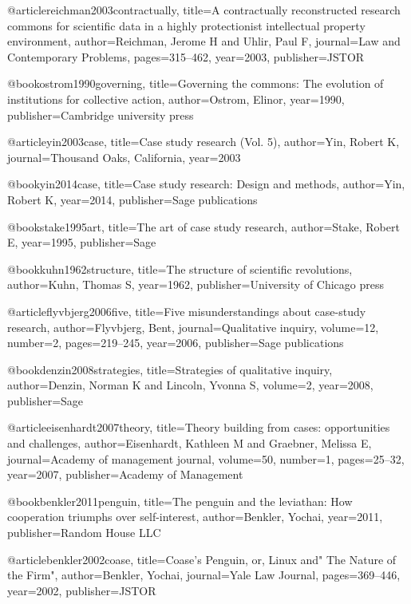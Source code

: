 @article{reichman2003contractually,
  title={A contractually reconstructed research commons for scientific data in a highly protectionist intellectual property environment},
  author={Reichman, Jerome H and Uhlir, Paul F},
  journal={Law and Contemporary Problems},
  pages={315--462},
  year={2003},
  publisher={JSTOR}
}


@book{ostrom1990governing,
  title={Governing the commons: The evolution of institutions for collective action},
  author={Ostrom, Elinor},
  year={1990},
  publisher={Cambridge university press}
}

@article{yin2003case,
  title={Case study research (Vol. 5)},
  author={Yin, Robert K},
  journal={Thousand Oaks, California},
  year={2003}
}

@book{yin2014case,
  title={Case study research: Design and methods},
  author={Yin, Robert K},
  year={2014},
  publisher={Sage publications}
}

@book{stake1995art,
  title={The art of case study research},
  author={Stake, Robert E},
  year={1995},
  publisher={Sage}
}

@book{kuhn1962structure,
  title={The structure of scientific revolutions},
  author={Kuhn, Thomas S},
  year={1962},
  publisher={University of Chicago press}
}

@article{flyvbjerg2006five,
  title={Five misunderstandings about case-study research},
  author={Flyvbjerg, Bent},
  journal={Qualitative inquiry},
  volume={12},
  number={2},
  pages={219--245},
  year={2006},
  publisher={Sage publications}
}

@book{denzin2008strategies,
  title={Strategies of qualitative inquiry},
  author={Denzin, Norman K and Lincoln, Yvonna S},
  volume={2},
  year={2008},
  publisher={Sage}
}

@article{eisenhardt2007theory,
  title={Theory building from cases: opportunities and challenges},
  author={Eisenhardt, Kathleen M and Graebner, Melissa E},
  journal={Academy of management journal},
  volume={50},
  number={1},
  pages={25--32},
  year={2007},
  publisher={Academy of Management}
}


@book{benkler2011penguin,
  title={The penguin and the leviathan: How cooperation triumphs over self-interest},
  author={Benkler, Yochai},
  year={2011},
  publisher={Random House LLC}
}


@article{benkler2002coase,
  title={Coase's Penguin, or, Linux and" The Nature of the Firm"},
  author={Benkler, Yochai},
  journal={Yale Law Journal},
  pages={369--446},
  year={2002},
  publisher={JSTOR}
}

